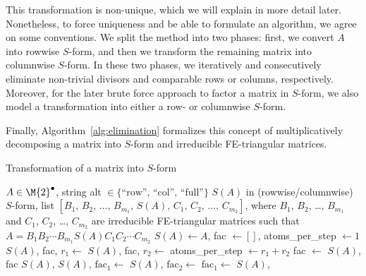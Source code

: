 This transformation is non-unique, which we will explain in more detail later. Nonetheless, to force uniqueness and be able to formulate an algorithm, we agree on some conventions. We split the method into two phases: first, we convert $A$ into rowwise $S$-form, and then we transform the remaining matrix into columnwise $S$-form. In these two phases, we iteratively and consecutively eliminate non-trivial divisors and comparable rows or columns, respectively. Moreover, for the later brute force approach to factor a matrix in $S$-form, we also model a transformation into either a row- or columnwise $S$-form.

Finally, Algorithm~\ref{alg:elimination} formalizes this concept of multiplicatively decomposing a matrix into $S$-form and irreducible FE-triangular matrices.

\begin{breakablealgorithm}
\caption{Transformation of a matrix into $S$-form}\label{alg:transf}
\begin{algorithmic}[1]
\Require $A \in {\M{2}}^\bullet$, string alt $\in \{ \text{``row''},\,\text{``col''},\,\text{``full''} \}$
\Ensure $S(A)$ in (rowwise/columnwise) $S$-form, list $[B_1, \, B_2, \, \dots, \, B_{m_1}, \, S(A), \, C_1,\, C_2, \,\dots, \,C_{m_2}]$, where $B_1$, $B_2$, \dots, $B_{m_1}$ and $C_1$, $C_2$, \dots, $C_{m_2}$ are irreducible FE-triangular matrices such that $A=B_1B_2\cdots B_{m_1} S(A)C_1C_2\cdots C_{m_2}$
\State $S(A) \gets A$, fac $\gets \left[ \right]$, atoms\_per\_step $\gets 1$
\State $S(A)$, fac, $r_1 \gets$ 
\State $S(A)$, fac, $r_2 \gets$ 
\State atoms\_per\_step  $\gets r_1 +r_2$
\EndWhile
\State fac $\gets$ 
\State \Return $S(A)$, fac
\EndIf
\State \Return $S(A)$,  
\Else {}
\State $S(A)$, $\text{fac}_1 \gets$ 
\State $S(A)$, $\text{fac}_2 \gets$ 
\State $\text{fac}_1 \gets$  
\State \Return $S(A)$, 
\EndIf
\EndFunction
\end{algorithmic}
\end{breakablealgorithm}

